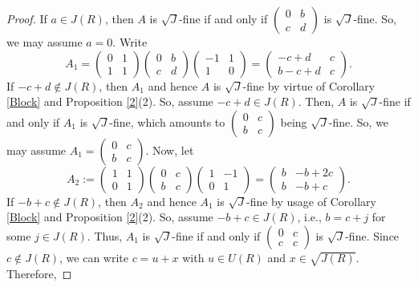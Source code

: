 \documentclass[12pt]{amsart}
\theoremstyle{definition}
\begin{document}
\begin{proof}
If \( a \in J(R) \), then \( A \) is $\sqrt{J}$-fine if and only if \( \begin{pmatrix} 0 & b \\ c & d \end{pmatrix} \) is $\sqrt{J}$-fine. So, we may assume \( a = 0 \).
Write
	\[
	A_1 = \begin{pmatrix} 0 & 1 \\ 1 & 1 \end{pmatrix} \begin{pmatrix} 0 & b \\ c & d \end{pmatrix} \begin{pmatrix} -1 & 1 \\ 1 & 0 \end{pmatrix}
	= \begin{pmatrix} -c+d & c \\ b-c+d & c \end{pmatrix}.
	\]
If \( -c+d \not\in J(R) \), then \( A_1 \) and hence \( A \) is $\sqrt{J}$-fine by virtue of Corollary \ref{Block} and Proposition \ref{2}(2). So, assume \( -c+d \in J(R) \). Then, \( A \) is $\sqrt{J}$-fine if and only if \( A_1 \) is $\sqrt{J}$-fine, which amounts to \( \begin{pmatrix} 0 & c \\ b & c \end{pmatrix} \) being $\sqrt{J}$-fine. So, we may assume
$
	A_1 = \begin{pmatrix} 0 & c \\ b & c \end{pmatrix}.
$
Now, let
	\[
	A_2 := \begin{pmatrix} 1 & 1 \\ 0 & 1 \end{pmatrix} \begin{pmatrix} 0 & c \\ b & c \end{pmatrix} \begin{pmatrix} 1 & -1 \\ 0 & 1 \end{pmatrix}
	= \begin{pmatrix} b & -b+2c \\ b & -b+c \end{pmatrix}.
	\]
If \( -b+c \not\in J(R) \), then \( A_2 \) and hence \( A_1 \) is $\sqrt{J}$-fine by usage of Corollary \ref{Block} and Proposition \ref{2}(2). So, assume \( -b+c \in J(R) \), i.e., \( b = c + j \) for some \( j \in J(R) \). Thus, \( A_1 \) is $\sqrt{J}$-fine if and only if \( \begin{pmatrix} 0 & c \\ c & c \end{pmatrix} \) is $\sqrt{J}$-fine. Since \( c \not\in J(R) \), we can write \( c = u + x \) with \( u \in U(R) \) and \( x \in \sqrt{J(R)} \). Therefore,

\end{proof}
\end{document}
